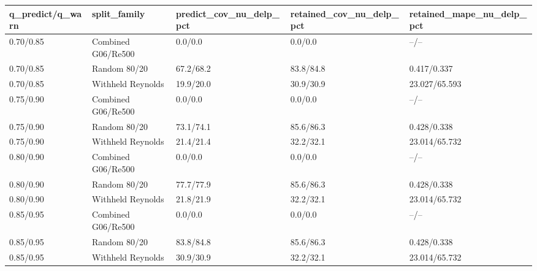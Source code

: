 \begin{tabular}{lllll}
\hline
q_predict/q_warn & split_family & predict_cov_nu_delp_pct & retained_cov_nu_delp_pct & retained_mape_nu_delp_pct \\
\hline
0.70/0.85 & Combined G06/Re500 & 0.0/0.0 & 0.0/0.0 & --/-- \\
0.70/0.85 & Random 80/20 & 67.2/68.2 & 83.8/84.8 & 0.417/0.337 \\
0.70/0.85 & Withheld Reynolds & 19.9/20.0 & 30.9/30.9 & 23.027/65.593 \\
0.75/0.90 & Combined G06/Re500 & 0.0/0.0 & 0.0/0.0 & --/-- \\
0.75/0.90 & Random 80/20 & 73.1/74.1 & 85.6/86.3 & 0.428/0.338 \\
0.75/0.90 & Withheld Reynolds & 21.4/21.4 & 32.2/32.1 & 23.014/65.732 \\
0.80/0.90 & Combined G06/Re500 & 0.0/0.0 & 0.0/0.0 & --/-- \\
0.80/0.90 & Random 80/20 & 77.7/77.9 & 85.6/86.3 & 0.428/0.338 \\
0.80/0.90 & Withheld Reynolds & 21.8/21.9 & 32.2/32.1 & 23.014/65.732 \\
0.85/0.95 & Combined G06/Re500 & 0.0/0.0 & 0.0/0.0 & --/-- \\
0.85/0.95 & Random 80/20 & 83.8/84.8 & 85.6/86.3 & 0.428/0.338 \\
0.85/0.95 & Withheld Reynolds & 30.9/30.9 & 32.2/32.1 & 23.014/65.732 \\
\hline
\end{tabular}
